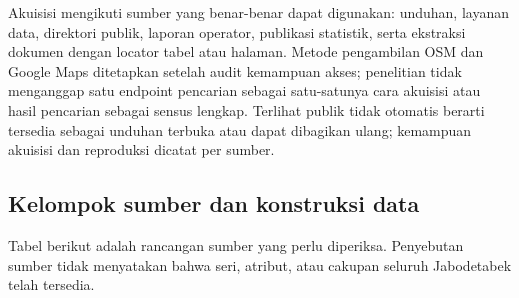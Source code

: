 \documentclass[11pt,a4paper,oneside,openany,indonesian]{report}
\begin{document}
Akuisisi mengikuti sumber yang benar-benar dapat digunakan: unduhan,
layanan data, direktori publik, laporan operator, publikasi statistik,
serta ekstraksi dokumen dengan locator tabel atau halaman. Metode
pengambilan OSM dan Google Maps ditetapkan setelah audit kemampuan
akses; penelitian tidak menganggap satu endpoint pencarian sebagai
satu-satunya cara akuisisi atau hasil pencarian sebagai sensus lengkap.
Terlihat publik tidak otomatis berarti tersedia sebagai unduhan terbuka
atau dapat dibagikan ulang; kemampuan akuisisi dan reproduksi dicatat
per sumber.

\subsection{Kelompok sumber dan konstruksi
data}\label{kelompok-sumber-dan-konstruksi-data}

Tabel berikut adalah rancangan sumber yang perlu diperiksa. Penyebutan
sumber tidak menyatakan bahwa seri, atribut, atau cakupan seluruh
Jabodetabek telah tersedia.
\end{document}
